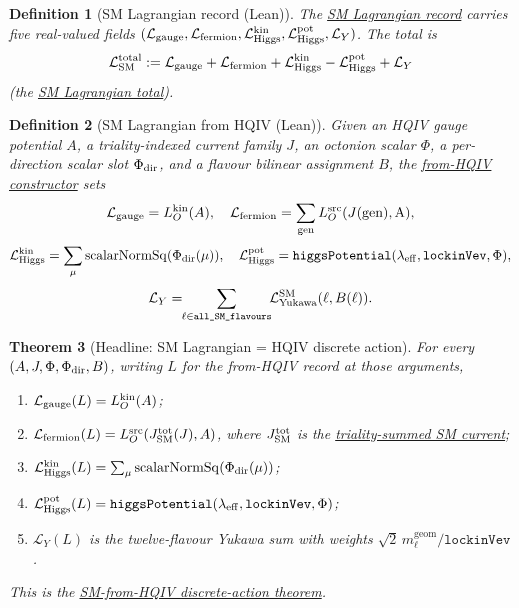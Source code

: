 \documentclass[11pt]{amsart}
\newtheorem{theorem}{Theorem}[section]
\newtheorem{definition}[theorem]{Definition}
\begin{document}
\begin{definition}[SM Lagrangian record (Lean)]
\label{def:SM-record}
The \hyperref[lean:SM-record]{SM Lagrangian record} carries five real-valued fields
$(\mathcal{L}_{\rm gauge},\mathcal{L}_{\rm fermion},
\mathcal{L}_{\rm Higgs}^{\rm kin},\mathcal{L}_{\rm Higgs}^{\rm pot},
\mathcal{L}_Y)$. The total is
\[
\mathcal{L}_{\rm SM}^{\rm total}
:= \mathcal{L}_{\rm gauge} + \mathcal{L}_{\rm fermion}
+ \mathcal{L}_{\rm Higgs}^{\rm kin} - \mathcal{L}_{\rm Higgs}^{\rm pot}
+ \mathcal{L}_Y
\]
(the \hyperref[lean:SM-total]{SM Lagrangian total}).
\end{definition}

\begin{definition}[SM Lagrangian from HQIV (Lean)]
\label{def:SM-fromHQIV}
Given an HQIV gauge potential $A$, a triality-indexed current family $J$,
an octonion scalar $\Phi$, a per-direction scalar slot $\Phi_{\rm dir}$, and
a flavour bilinear assignment $B$, the
\hyperref[lean:SM-fromHQIV]{from-HQIV constructor} sets
\[
\mathcal{L}_{\rm gauge} = L_O^{\rm kin}(A),\quad
\mathcal{L}_{\rm fermion} = \sum_{\rm gen}L_O^{\rm src}(J(\rm gen),A),
\]
\[
\mathcal{L}_{\rm Higgs}^{\rm kin} = \sum_\mu \mathrm{scalarNormSq}(\Phi_{\rm dir}(\mu)),\quad
\mathcal{L}_{\rm Higgs}^{\rm pot} = \texttt{higgsPotential}(\lambda_{\rm eff},\texttt{lockinVev},\Phi),
\]
\[
\mathcal{L}_Y = \!\!\sum_{\ell\in\texttt{all\_SM\_flavours}}\!\! \mathcal{L}^{\rm SM}_{\rm Yukawa}(\ell, B(\ell)) .
\]
\end{definition}

\begin{theorem}[Headline: SM Lagrangian = HQIV discrete action]
\label{thm:headline}
For every $(A, J, \Phi, \Phi_{\rm dir}, B)$, writing $L$ for the from-HQIV
record at those arguments,
\begin{enumerate}[leftmargin=2em]
\item $\mathcal{L}_{\rm gauge}(L) = L_O^{\rm kin}(A)$;
\item $\mathcal{L}_{\rm fermion}(L) = L_O^{\rm src}\!\left(J_{\rm SM}^{\rm tot}(J),A\right)$,
where $J_{\rm SM}^{\rm tot}$ is the \hyperref[lean:J-SM-total]{triality-summed SM current};
\item $\mathcal{L}_{\rm Higgs}^{\rm kin}(L)
= \sum_\mu \mathrm{scalarNormSq}(\Phi_{\rm dir}(\mu))$;
\item $\mathcal{L}_{\rm Higgs}^{\rm pot}(L)
= \texttt{higgsPotential}(\lambda_{\rm eff},\texttt{lockinVev},\Phi)$;
\item $\mathcal{L}_Y(L)$ is the twelve-flavour Yukawa sum with weights
$\sqrt{2}\,m_\ell^{\mathrm{geom}}/\texttt{lockinVev}$.
\end{enumerate}
This is the \hyperref[lean:headline]{SM-from-HQIV discrete-action theorem}.
\end{theorem}
\end{document}
